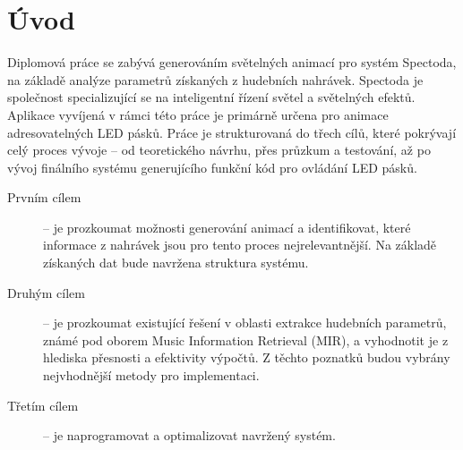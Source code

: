 \chapter*{Úvod}
{}

Diplomová práce se zabývá generováním světelných animací pro systém Spectoda, na základě analýze parametrů získaných z hudebních nahrávek. Spectoda je společnost specializující se na inteligentní řízení světel a světelných efektů. Aplikace vyvíjená v rámci této práce je primárně určena pro animace adresovatelných LED pásků. Práce je strukturovaná do třech cílů, které pokrývají celý proces vývoje -- od teoretického návrhu, přes průzkum a testování, až po vývoj finálního systému generujícího funkční kód pro ovládání LED pásků.

\begin{description}
    \item[Prvním cílem] -- je prozkoumat možnosti generování animací a identifikovat, které informace z nahrávek jsou pro tento proces nejrelevantnější. Na základě získaných dat bude navržena struktura systému.
    \item[Druhým cílem] -- je prozkoumat existující řešení v oblasti extrakce hudebních parametrů, známé pod oborem Music Information Retrieval (MIR), a vyhodnotit je z hlediska přesnosti a efektivity výpočtů. Z těchto poznatků budou vybrány nejvhodnější metody pro implementaci.
    \item[Třetím cílem] -- je naprogramovat a optimalizovat navržený systém. 
\end{description}




